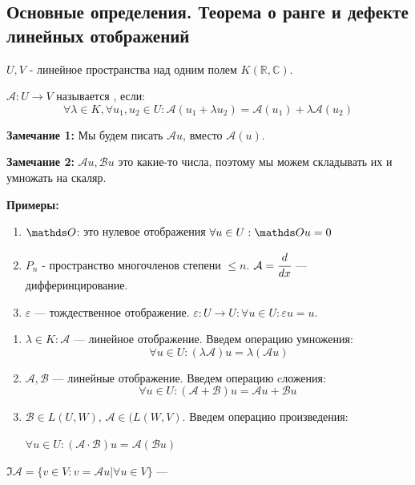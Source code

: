 \subsection{Основные определения. Теорема о ранге и дефекте линейных отображений}

 $U,V$ - линейное пространства над одним полем $K(\mathbb{R}, \mathbb{C})$.

$\mathcal{A}: U\rightarrow V$ называется , если: 
$$\forall \lambda \in K,\forall u_1, u_2 \in U: \mathcal{A}(u_1 + \lambda u_2) = \mathcal{A} (u_1) + \lambda\mathcal{A}(u_2)$$

\textbf{Замечание 1:} Мы будем писать $\mathcal{A} u$, вместо $\mathcal{A}(u)$.

\textbf{Замечание 2:} $\mathcal{A}u, \mathcal{B}u$ это какие-то числа, поэтому мы можем складывать их и умножать на скаляр.

\textbf{Примеры:}
\begin{enumerate}
    \item $\zero$: это нулевое отображения $\forall u \in U: \zero u = 0$ 

    \item $P_n$ - пространство многочленов степени $\leq n$. $\mathcal{A}=\cfrac{d}{dx}$ --- дифферинцирование.

    \item $\varepsilon$ --- тождественное отображение. $\varepsilon: U\rightarrow U:\forall u\in U: \varepsilon u = u$.
\end{enumerate}


\begin{enumerate}
    \item $\lambda \in K: \mathcal{A}$ --- линейное отображение. Введем операцию умножения:
$$\ \forall u \in U: (\lambda\mathcal{A}) u = \lambda(\mathcal{A} u)$$
    \item $\mathcal{A}, \mathcal{B}$ --- линейные отображение. Введем операцию cложения: 
    $$ \forall u \in U:(\mathcal{A} + \mathcal{B}) u = \mathcal{A}u + \mathcal{B}u $$
    

    \item  $\mathcal{B}\in L(U,W)$, $\mathcal{A} \in (L(W,V)$. Введем операцию произведения:

    $\forall u \in U:(\mathcal{A} \cdot \mathcal{B}) u = \mathcal{A}(\mathcal{B}u)$
    
\end{enumerate}


 $\Im \mathcal{A} = \{v \in V:v =\mathcal{A} u| \forall u\in V \}$ --- 

